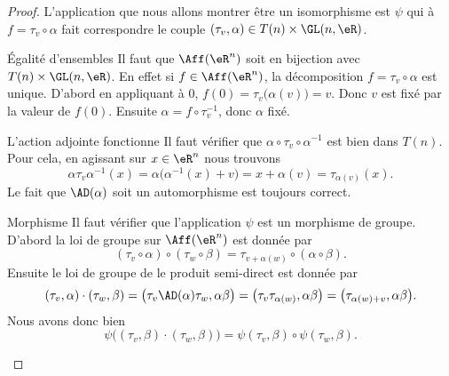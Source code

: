 \begin{proof}
    L'application que nous allons montrer être un isomorphisme est \( \psi\) qui à \( f=\tau_v\circ\alpha\) fait correspondre le couple \( (\tau_v,\alpha)\in T(n)\times \GL(n,\eR)\).
    \begin{subproof}
        \item[Égalité d'ensembles]
            Il faut que \( \Aff(\eR^n)\) soit en bijection avec \( T(n)\times \GL(n,\eR)\). En effet si \( f\in \Aff(\eR^n)\), la décomposition \(f=\tau_v\circ\alpha \) est unique. D'abord en appliquant à \( 0\), \( f(0)=\tau_v\big( \alpha(v) \big)=v\). Donc \( v\) est fixé par la valeur de \( f(0)\). Ensuite \( \alpha=f\circ\tau_v^{-1}\), donc \( \alpha \) fixé.
        \item[L'action adjointe fonctionne]
            Il faut vérifier que \( \alpha\circ\tau_v\circ\alpha^{-1}\) est bien dans \( T(n)\). Pour cela, en agissant sur \( x\in \eR^n\) nous trouvons
            \begin{equation}
                \alpha\tau_v\alpha^{-1}(x)=\alpha\big( \alpha^{-1}(x)+v \big)=x+\alpha(v)=\tau_{\alpha(v)}(x).
            \end{equation}
            Le fait que \( \AD(\alpha)\) soit un automorphisme est toujours correct.
        \item[Morphisme]
            Il faut vérifier que l'application \( \psi\) est un morphisme de groupe. D'abord la loi de groupe sur \( \Aff(\eR^n)\) est donnée par
            \begin{equation}
                (\tau_v\circ \alpha)\circ(\tau_w\circ\beta)=\tau_{v+\alpha(w)}\circ(\alpha\circ\beta).
            \end{equation}
            Ensuite le loi de groupe de le produit semi-direct est donnée par
            \begin{equation}
                (\tau_v,\alpha)\cdot(\tau_w,\beta)=\big( \tau_v\AD(\alpha)\tau_w,\alpha\beta \big)=\big( \tau_v\tau_{\alpha(w)},\alpha\beta \big)=\big( \tau_{\alpha(w)+v},\alpha\beta \big).
            \end{equation}
            Nous avons donc bien
            \begin{equation}
                \psi\big( (\tau_v,\beta)\cdot(\tau_w,\beta) \big)=\psi(\tau_v,\beta)\circ\psi(\tau_w,\beta).
            \end{equation}
    \end{subproof}
\end{proof}

